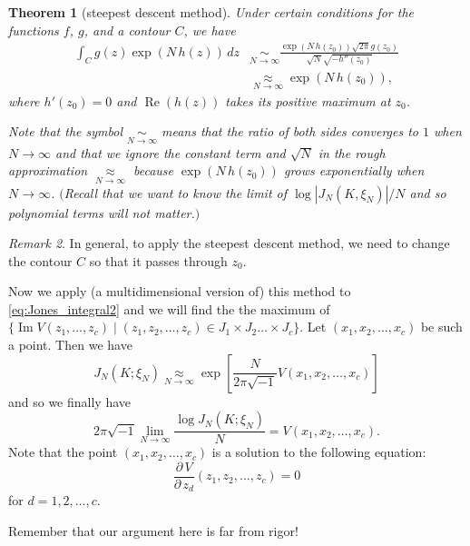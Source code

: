 \documentclass{amsart}
\renewcommand{\Re}{\operatorname{Re}}
\renewcommand{\Im}{\operatorname{Im}}
\newtheorem{theorem}{Theorem}[section]
\theoremstyle{definition}
\theoremstyle{remark}
\newtheorem{remark}[theorem]{Remark}
\numberwithin{equation}{section}
\begin{document}
\begin{theorem}[steepest descent method]\label{thm:steepest_descent_method}
Under certain conditions for the functions $f$, $g$, and a contour $C$, we have
\begin{equation*}
\begin{split}
  \int_{C}g(z)\exp(N\,h(z))\,dz
  &\underset{N\to\infty}{\sim}
  \frac{\exp(N\,h(z_0))\sqrt{2\pi}g(z_0)}{\sqrt{N}\sqrt{-h''(z_0)}}
  \\
  &\underset{N\to\infty}{\approx}
  \exp(N\,h(z_0)),
\end{split}
\end{equation*}
where $h'(z_0)=0$ and $\Re(h(z))$ takes its positive maximum at $z_0$.
\par
Note that the symbol $\underset{N\to\infty}{\sim}$ means that the ratio of both sides converges to $1$ when $N\to\infty$ and that we ignore the constant term and $\sqrt{N}$ in the rough approximation $\underset{N\to\infty}{\approx}$ because $\exp(N\,h(z_0))$ grows exponentially when $N\to\infty$.
$($Recall that we want to know the limit of $\log|J_N(K,\xi_N)|/N$ and so polynomial terms will not matter.$)$
\end{theorem}
\begin{remark}
In general, to apply the steepest descent method, we need to change the contour $C$ so that it passes through $z_0$.
\end{remark}
Now we apply (a multidimensional version of) this method to \eqref{eq:Jones_integral2} and we will find the the maximum of $\{\Im V(z_1,\dots,z_c)\mid{(z_1,z_2,\dots,z_c)\in J_1\times J_2\dots\times J_c}\}$.
Let $(x_1,x_2,\dots,x_c)$ be such a point.
Then we have
\begin{equation}\label{eq:steepest_descent}
  J_N(K;\xi_N)
  \underset{N\to\infty}{\approx}
  \exp
  \left[
    \frac{N}{2\pi\sqrt{-1}}
    V(x_1,x_2,\dots,x_c)
  \right]
\end{equation}
and so we finally have
\begin{equation}\label{eq:limit}
  2\pi\sqrt{-1}
  \lim_{N\to\infty}
  \frac{\log{J_N(K;\xi_N)}}{N}
  =
  V(x_1,x_2,\dots,x_c).
\end{equation}
Note that the point $(x_1,x_2,\dots,x_c)$ is a solution to the following equation:
\begin{equation}\label{eq:differential}
  \frac{\partial\,V}{\partial\,z_d}(z_1,z_2,\dots,z_c)=0
\end{equation}
for $d=1,2,\dots,c$.
\par
Remember that our argument here is far from rigor!
\end{document}
